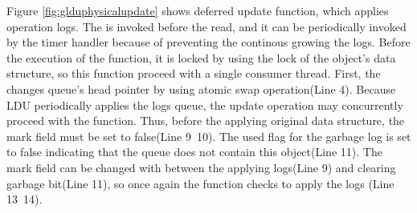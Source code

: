 
Figure \ref{fig:glduphysicalupdate} shows deferred update function, which
applies operation logs.
The  is invoked before the read, and it can be
periodically invoked by the timer handler because of preventing the continous
growing the logs.
Before the execution of the  function, it is locked by using
the lock of the object's data structure, so this function proceed with a single
consumer thread.
First, the  changes queue's head pointer by using atomic swap
operation(Line 4).
Because LDU periodically applies the logs queue, the update operation may 
concurrently proceed with the  function.
Thus, before the applying original data structure, the mark field must be set
to false(Line 9~10).
The used flag for the garbage log is set to false indicating that the queue
does not contain this object(Line 11).
The mark field can be changed with between the applying logs(Line 9) and
clearing garbage bit(Line 11), so once again the  function
checks to apply the logs (Line 13~14).

